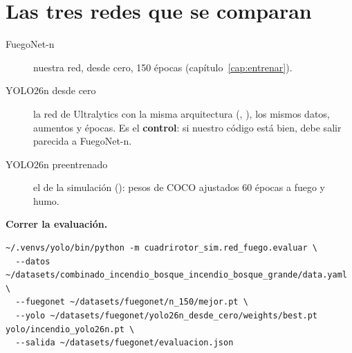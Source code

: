 \section{Las tres redes que se comparan}

\begin{description}
  \item[FuegoNet-n] nuestra red, desde cero, 150 épocas (capítulo~\ref{cap:entrenar}).
  \item[YOLO26n desde cero] la red de Ultralytics con la misma arquitectura
        (, ), los mismos datos, aumentos y
        épocas. Es el \textbf{control}: si nuestro código está bien, debe salir
        parecida a FuegoNet-n.
  \item[YOLO26n preentrenado] el de la simulación ():
        pesos de COCO ajustados 60 épocas a fuego y humo.
\end{description}

 \textbf{Correr la evaluación.}
\begin{lstlisting}[style=bash]
~/.venvs/yolo/bin/python -m cuadrirotor_sim.red_fuego.evaluar \
  --datos ~/datasets/combinado_incendio_bosque_incendio_bosque_grande/data.yaml \
  --fuegonet ~/datasets/fuegonet/n_150/mejor.pt \
  --yolo ~/datasets/fuegonet/yolo26n_desde_cero/weights/best.pt yolo/incendio_yolo26n.pt \
  --salida ~/datasets/fuegonet/evaluacion.json
\end{lstlisting}



